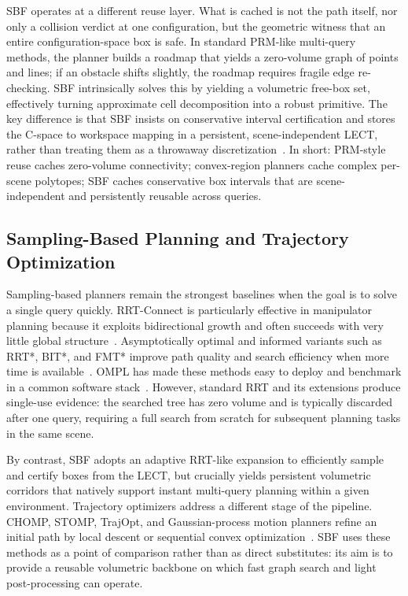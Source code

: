 \documentclass[journal]{IEEEtran}
\begin{document}
SBF operates at a different reuse layer. What is cached is not the path itself,
nor only a collision verdict at one configuration, but the geometric witness
that an entire configuration-space box is safe. In standard PRM-like multi-query
methods, the planner builds a roadmap that yields a zero-volume graph of points
and lines; if an obstacle shifts slightly, the roadmap requires fragile edge
re-checking. SBF intrinsically solves this by yielding a volumetric free-box
set, effectively turning approximate cell decomposition into a robust primitive.
The key difference is that SBF insists on conservative interval certification and
stores the C-space to workspace mapping in a persistent, scene-independent LECT,
rather than treating them as a throwaway discretization~\cite{lozanoperez1983spatial,brooks1985subdivision}.
In short: PRM-style reuse caches zero-volume connectivity; convex-region planners cache complex per-scene polytopes; SBF caches conservative box intervals that are scene-independent and persistently reusable across queries.

\subsection{Sampling-Based Planning and Trajectory Optimization}

Sampling-based planners remain the strongest baselines when the goal is to solve
a single query quickly. RRT-Connect is particularly effective in manipulator
planning because it exploits bidirectional growth and often succeeds with very
little global structure~\cite{kuffner2000rrt}. Asymptotically optimal and
informed variants such as RRT*, BIT*, and FMT* improve path quality and search
efficiency when more time is available~\cite{karaman2011sampling,
gammell2015batch,gammell2018informed,janson2015fmt}. OMPL has made these
methods easy to deploy and benchmark in a common software stack~\cite{sucan2012ompl,
moll2015benchmarking}. However, standard RRT and its extensions produce single-use
evidence: the searched tree has zero volume and is typically discarded after one
query, requiring a full search from scratch for subsequent planning tasks in
the same scene.

By contrast, SBF adopts an adaptive RRT-like expansion to efficiently sample and
certify boxes from the LECT, but crucially yields persistent volumetric corridors
that natively support instant multi-query planning within a given environment.
Trajectory optimizers address a different stage of the pipeline. CHOMP, STOMP,
TrajOpt, and Gaussian-process motion planners refine an initial path by local
descent or sequential convex optimization~\cite{ratliff2009chomp,
kalakrishnan2011stomp,schulman2014motion,mukadam2018gpmp2}. SBF uses these
methods as a point of comparison rather than as direct substitutes: its aim is
to provide a reusable volumetric backbone on which fast graph search and light
post-processing can operate.
\end{document}
